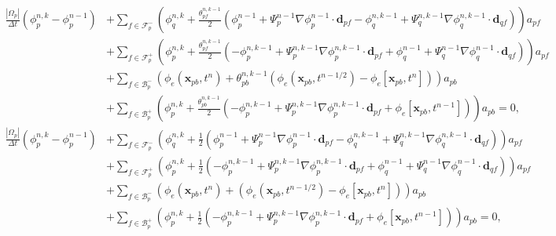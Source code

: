 \documentclass{article}
\begin{document}
\begin{align}
	\nonumber
	\frac{|\Omega_p|}{\Delta t}(\phi_p^{n,k} - \phi_p^{n-1}) 
	&+ \sum_{f \in \mathcal{F}_p^-}(\phi_q^{n, k} + 
	\frac{\theta_{pf}^{n,k-1}}{2}(\phi_p^{n-1} + \Psi_p^{n-1}\nabla\phi_p^{n-1}\cdot\boldsymbol{d}_{pf}
	- \phi_q^{n, k-1} + \Psi_q^{n, k-1}\nabla\phi_q^{n, k-1}\cdot\boldsymbol{d}_{qf})) a_{pf} \nonumber\\ 
	&+ \sum_{f \in \mathcal{F}_p^+} (\phi_p^{n, k} + 
	\frac{\theta_{pf}^{n,k-1}}{2}(-\phi_p^{n, k-1} + \Psi_p^{n, k-1}\nabla\phi_p^{n, k-1}\cdot\boldsymbol{d}_{pf}
	+
	\phi_q^{n-1} + \Psi_q^{n-1}\nabla\phi_q^{n-1}\cdot\boldsymbol{d}_{qf}))a_{pf}\nonumber\\ 
	&+ \sum_{f \in \mathcal{B}_p^-} (\phi_e(\boldsymbol{x}_{pb}, t^{n}) + \theta_{pb}^{n,k-1}(\phi_e(\boldsymbol{x}_{pb}, t^{n-1/2}) - \phi_e[\boldsymbol{x}_{pb}, t^{n}])) a_{pb}\nonumber \\
	&+ \sum_{f \in \mathcal{B}_p^+} (\phi_p^{n,k} + \frac{\theta_{pb}^{n,k-1}}{2}(-\phi_p^{n, k-1} + \Psi_p^{n, k-1}\nabla\phi_p^{n,k-1}\cdot\boldsymbol{d}_{pf}
	+
	\phi_e[\boldsymbol{x}_{pb}, t^{n-1}])) a_{pb} = 0,
\end{align}
\begin{align}
	\nonumber
	\frac{|\Omega_p|}{\Delta t}(\phi_p^{n,k} - \phi_p^{n-1}) 
	&+ \sum_{f \in \mathcal{F}_p^-}(\phi_q^{n, k} + 
	\frac{1}{2}(\phi_p^{n-1} + \Psi_p^{n-1}\nabla\phi_p^{n-1}\cdot\boldsymbol{d}_{pf}
	- \phi_q^{n, k-1} + \Psi_q^{n, k-1}\nabla\phi_q^{n, k-1}\cdot\boldsymbol{d}_{qf})) a_{pf} \nonumber\\ 
	&+ \sum_{f \in \mathcal{F}_p^+} (\phi_p^{n, k} + 
	\frac{1}{2}(-\phi_p^{n, k-1} + \Psi_p^{n, k-1}\nabla\phi_p^{n, k-1}\cdot\boldsymbol{d}_{pf}
	+
	\phi_q^{n-1} + \Psi_q^{n-1}\nabla\phi_q^{n-1}\cdot\boldsymbol{d}_{qf}))a_{pf}\nonumber\\ 
	&+ \sum_{f \in \mathcal{B}_p^-} (\phi_e(\boldsymbol{x}_{pb}, t^{n}) + (\phi_e(\boldsymbol{x}_{pb}, t^{n-1/2}) - \phi_e[\boldsymbol{x}_{pb}, t^{n}])) a_{pb}\nonumber \\
	&+ \sum_{f \in \mathcal{B}_p^+} (\phi_p^{n,k} + \frac{1}{2}(-\phi_p^{n, k-1} + \Psi_p^{n, k-1}\nabla\phi_p^{n,k-1}\cdot\boldsymbol{d}_{pf}
	+
	\phi_e[\boldsymbol{x}_{pb}, t^{n-1}])) a_{pb} = 0,
\end{align}
\end{document}
